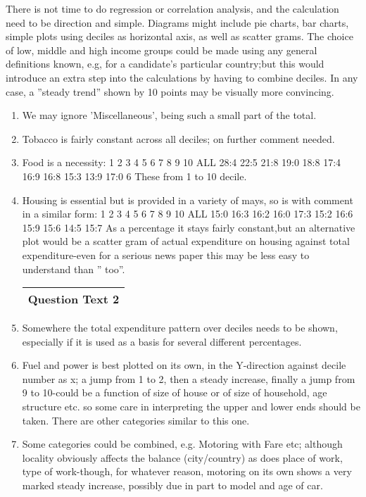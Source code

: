 \documentclass[a4paper,12pt]{article}
\begin{document}
\begin{enumerate}
There is not time to do regression or correlation analysis, and the calculation need to be
direction and simple. Diagrams might include pie charts, bar charts, simple plots using deciles
as horizontal axis, as well as scatter grams.
The choice of low, middle and high income groups could be made using any general definitions
known, e.g, for a candidate’s particular country;but this would introduce an extra step into the
calculations by having to combine deciles. In any case, a ”steady trend” shown by 10 points
may be visually more convincing.
\begin{enumerate}
\item  We may ignore ’Miscellaneous’, being such a small part of the total.
\item  Tobacco is fairly constant across all deciles; on further comment needed.
\item  Food is a necessity: %
1 2 3 4 5 6 7 8 9 10 ALL
28:4 22:5 21:8 19:0 18:8 17:4 16:9 16:8 15:3 13:9 17:0
6
These %
from 1 to 10 decile.
\item  Housing is essential but is provided in a variety of mays, so is with comment in a similar
form: %
1 2 3 4 5 6 7 8 9 10 ALL
15:0 16:3 16:2 16:0 17:3 15:2 16:6 15:9 15:6 14:5 15:7
As a percentage it stays fairly constant,but an alternative plot would be a scatter gram
of actual expenditure on housing against total expenditure-even for a serious news paper
this may be less easy to understand than ”%
too”.
  \begin{table}[ht!]
     \centering
     \begin{tabular}{|p{15cm}|}
     \hline  
Question Text 2   
 \\ \hline 
      \end{tabular}
    \end{table}\item  Somewhere the total expenditure pattern over deciles needs to be shown, especially if it
is used as a basis for several different percentages.
\item  Fuel and power is best plotted on its own, in the Y-direction against decile number as x; a
jump from 1 to 2, then a steady increase, finally a jump from 9 to 10-could be a function
of size of house or of size of household, age structure etc. so some care in interpreting
the upper and lower ends should be taken. There are other categories similar to this one.
\item  Some categories could be combined, e.g. Motoring with Fare etc; although locality
obviously affects the balance (city/country) as does place of work, type of work-though,
for whatever reason, motoring on its own shows a very marked steady increase, possibly
due in part to model and age of car.


\end{enumerate}
\end{enumerate}
\end{document}
